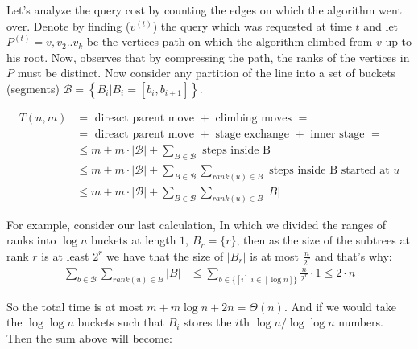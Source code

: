 Let's analyze the query cost by counting the edges on which the algorithm went over. Denote by finding ($v^{(t)}$) the query which was requested at time $t$ and let $P^{(t)}=v,v_{2} .. v_{k}$ be the vertices path on which the algorithm climbed from $v$ up to his root. Now, observes that by compressing the path, the ranks of the vertices in $P$ must be distinct. Now consider any partition of the line into a set of buckets (segments) $\mathcal{B}= \left\{ B_{i} | B_{i} = [b_{i},b_{i+1}] \right\}$. 


\begin{equation*}
  \begin{split}
    T\left( n, m  \right) &= \text{ direact parent move } + \text{ climbing moves  } =    \\
    &=  \text{ direact parent move } + \text{ stage exchange } +  \text{ inner stage } = \\ 
    & \le m + m \cdot | \mathcal{B} | + \sum_{ B \in \mathcal{B} }{ \text{ steps inside B  }   }\\
    & \le m + m \cdot | \mathcal{B} | + \sum_{ B \in \mathcal{B} }{ \sum_{ rank(u) \in B} { \text{ steps inside B started at }u }  }\\
    & \le m + m \cdot | \mathcal{B} | + \sum_{ B \in \mathcal{B} }{ \sum_{ rank(u) \in B}{ |B| }  } %
  \end{split}
\end{equation*}

For example, consider our last calculation, In which we divided the ranges of ranks into $\log n$ buckets at length $1$, $B_{r} = \{r\}$, then as the size of the subtrees at rank $r$ is at least $2^{r}$ we have that the size of $|B_{r}|$ is at most $\frac{n}{2^{r}}$ and that's why:   
\begin{equation*}
  \begin{split}
    \sum_{ b \in \mathcal{B} }{ \sum_{ rank(u) \in B}{ |B| } } &\le \sum_{ b \in \{ [i] | i \in [ \log n ]  \}  }{ \frac{n}{2^{r}} \cdot 1    } \le  2\cdot n
  \end{split}
\end{equation*}

So the total time is at most $m + m \log n + 2n = \Theta\left( n \right)$. And if we would take the $ \log \log n $ buckets such that $B_{i}$ stores the  $i$th $ \log n /  \log \log n $ numbers. Then the sum above will become:   

